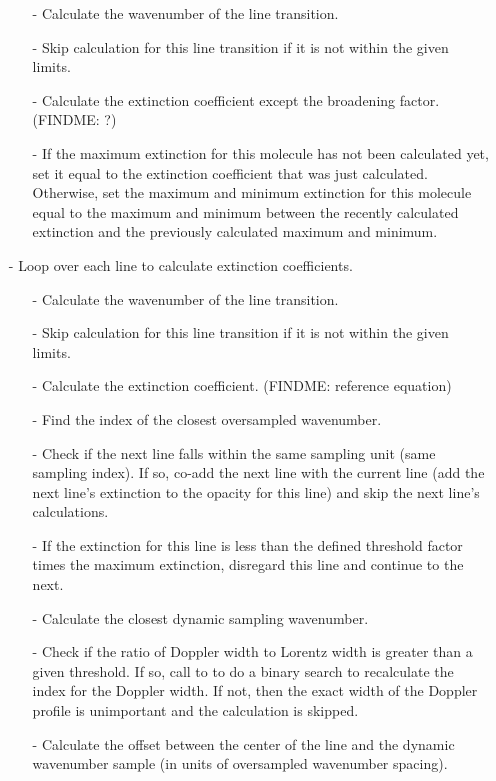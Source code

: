 \documentclass[letterpaper,12pt]{article}
\begin{document}
\begin{enumerate}[leftmargin=10pt, noitemsep, parsep=0pt, topsep=0ex]
\begin{enumerate}[leftmargin=10pt, noitemsep, parsep=0pt, topsep=0ex]
\item[-] Calculate the wavenumber of the line transition.
\item[-] Skip calculation for this line transition if it is not within the given limits.
\item[-] Calculate the extinction coefficient except the broadening factor. (FINDME: ?)
\item[-] If the maximum extinction for this molecule has not been calculated yet, set it equal to the extinction coefficient that was just calculated. Otherwise, set the maximum and minimum extinction for this molecule equal to the maximum and minimum between the recently calculated extinction and the previously calculated maximum and minimum.
\end{enumerate}
\item[-] Loop over each line to calculate extinction coefficients.
\begin{enumerate}[leftmargin=10pt, noitemsep, parsep=0pt, topsep=0ex]
\item[-] Calculate the wavenumber of the line transition.
\item[-] Skip calculation for this line transition if it is not within the given limits.
\item[-] Calculate the extinction coefficient. (FINDME: reference equation)
\item[-] Find the index of the closest oversampled wavenumber.
\item[-] Check if the next line falls within the same sampling unit (same sampling index). If so, co-add the next line with the current line (add the next line's extinction to the opacity for this line) and skip the next line's calculations.
\item[-] If the extinction for this line is less than the defined threshold factor times the maximum extinction, disregard this line and continue to the next.
\item[-] Calculate the closest dynamic sampling wavenumber.
\item[-] Check if the ratio of Doppler width to Lorentz width is greater than a given threshold. If so, call to  to do a binary search to recalculate the index for the Doppler width. If not, then the exact width of the Doppler profile is unimportant and the calculation is skipped.
\item[-] Calculate the offset between the center of the line and the dynamic wavenumber sample (in units of oversampled wavenumber spacing).

\end{enumerate}
\end{enumerate}
\end{document}
